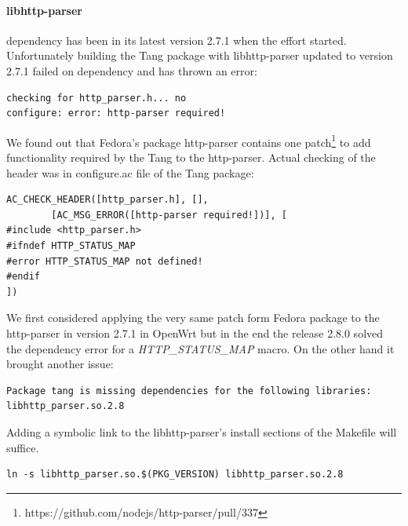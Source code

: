 \paragraph{libhttp-parser} dependency has been in its latest version 2.7.1 when the effort started.
Unfortunately building the Tang package with libhttp-parser updated to version 2.7.1 failed on dependency and has thrown an error:
\begin{lstlisting}[columns=fixed,basicstyle=\ttfamily\footnotesize,tabsize=4,backgroundcolor=\color{yellow!10}]
checking for http_parser.h... no
configure: error: http-parser required!
\end{lstlisting}
We found out that Fedora's package http-parser contains one patch\footnote{https://github.com/nodejs/http-parser/pull/337} to add functionality required by the Tang to the http-parser.
Actual checking of the header was in configure.ac file of the Tang package:
\begin{lstlisting}[columns=fixed,basicstyle=\ttfamily\footnotesize,tabsize=4,backgroundcolor=\color{yellow!10}]
AC_CHECK_HEADER([http_parser.h], [],
		[AC_MSG_ERROR([http-parser required!])], [
#include <http_parser.h>
#ifndef HTTP_STATUS_MAP
#error HTTP_STATUS_MAP not defined!
#endif
])
\end{lstlisting}
We first considered applying the very same patch form Fedora package to the http-parser in version 2.7.1 in OpenWrt but in the end the release 2.8.0 solved the dependency error for a {\it HTTP\_STATUS\_MAP} macro.
On the other hand it brought another issue:
\begin{lstlisting}[columns=fixed,basicstyle=\ttfamily\footnotesize,tabsize=4,backgroundcolor=\color{yellow!10}]
Package tang is missing dependencies for the following libraries:
libhttp_parser.so.2.8
\end{lstlisting}
Adding a symbolic link to the libhttp-parser's install sections of the Makefile will suffice.
\begin{lstlisting}[columns=fixed,basicstyle=\ttfamily\footnotesize,tabsize=4,backgroundcolor=\color{yellow!10}]
ln -s libhttp_parser.so.$(PKG_VERSION) libhttp_parser.so.2.8
\end{lstlisting}

